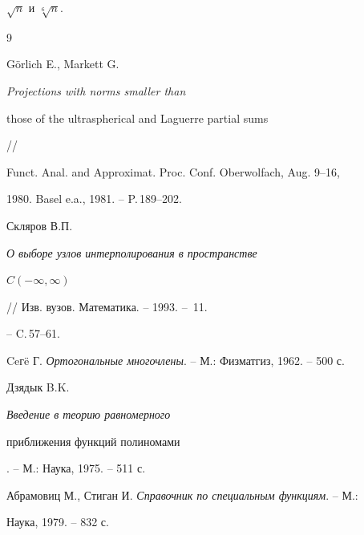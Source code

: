 $\sqrt{n}$ и $\sqrt[6]{n}$.





\begin{thebibliography}{9}







G\"orlich E., Markett G. {\em Projections with norms smaller than


those of the ultraspherical and Laguerre partial sums} //


Funct. Anal. and Approximat. Proc. Conf. Oberwolfach, Aug. 9--16,


1980. Basel e.a., 1981. -- P.\,189--202.




Скляров В.П. {\em О выборе узлов интерполирования в пространстве 


$C(-\infty,\infty)$} // Изв. вузов. Математика. -- 1993. -- \No\,11.


-- C.\,57--61.




Ceг\"e Г. {\em Ортогональные многочлены}. -- М.: Физматгиз, 1962. -- 500 с. 




Дзядык B.K. {\em Введение в теорию равномерного


приближения функций полиномами}. -- М.: Наука, 1975. -- 511 с. 




Абрамовиц М., Стиган И. {\em Справочник по специальным функциям}. -- М.:


Наука, 1979. -- 832 с.





\end{thebibliography}





\vskip 0.5cm












\label{end}





